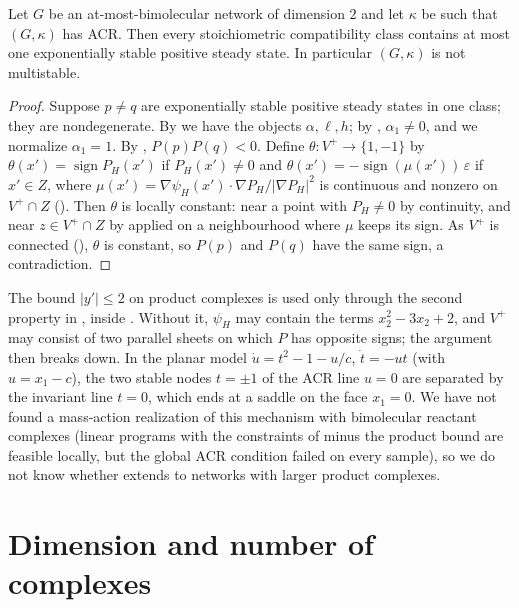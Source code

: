 \documentclass[11pt,a4paper]{report}
\newcommand{\Vp}{V^{+}}
\begin{document}
\begin{theorem}\label{thm:dim-two}
Let $G$ be an at-most-bimolecular network of dimension $2$ and let $\kappa$ be such that $(G,\kappa)$ has ACR. Then
every stoichiometric compatibility class contains at most one exponentially stable positive steady state. In
particular $(G,\kappa)$ is not multistable.
\end{theorem}

\begin{proof}
Suppose $p\neq q$ are exponentially stable positive steady states in one class; they are nondegenerate. By
 we have the objects $\alpha,\ell,h$; by ,
$\alpha_1\neq0$, and we normalize $\alpha_1=1$. By , $P(p)P(q)<0$. Define
$\theta\colon\Vp\to\{1,-1\}$ by $\theta(x')=\operatorname{sign}P_H(x')$ if $P_H(x')\neq0$ and
$\theta(x')=-\operatorname{sign}(\mu(x'))\,\varepsilon$ if $x'\in Z$, where $\mu(x')=\nabla\psi_H(x')\cdot\nabla
P_H/|\nabla P_H|^2$ is continuous and nonzero on $\Vp\cap Z$ (). Then $\theta$ is locally
constant: near a point with $P_H\neq0$ by continuity, and near $z\in\Vp\cap Z$ by  applied on a
neighbourhood where $\mu$ keeps its sign. As $\Vp$ is connected (), $\theta$ is constant, so
$P(p)$ and $P(q)$ have the same sign, a contradiction.
\end{proof}

\begin{remark}\label{rem:products}
The bound $|y'|\le2$ on product complexes is used only through the second property in , inside
. Without it, $\psi_H$ may contain the terms $x_2^2-3x_2+2$, and $\Vp$ may consist of two
parallel sheets on which $P$ has opposite signs; the argument then breaks down. In the planar model
$\dot u=t^2-1-u/c$, $\dot t=-ut$ (with $u=x_1-c$), the two stable nodes $t=\pm1$ of the ACR line $u=0$ are separated
by the invariant line $t=0$, which ends at a saddle on the face $x_1=0$. We have not found a mass-action realization
of this mechanism with bimolecular reactant complexes (linear programs with the constraints of 
minus the product bound are feasible locally, but the global ACR condition failed on every sample), so we do not
know whether  extends to networks with larger product complexes.
\end{remark}

\section{Dimension and number of complexes}\label{sec:consequences}
\end{document}
